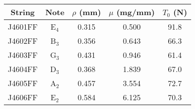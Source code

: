 \begin{tabular}{ccccc}
\toprule
String & Note & $\rho$ (mm) & $\mu$ (mg/mm) & $T_0$ (N) \\
\midrule
J4601FF & E$_{4}$ & 0.315 & 0.500 & 91.8 \\
J4602FF & B$_{3}$ & 0.356 & 0.643 & 66.3 \\
J4603FF & G$_{3}$ & 0.431 & 0.946 & 61.4 \\
J4604FF & D$_{3}$ & 0.368 & 1.839 & 67.0 \\
J4605FF & A$_{2}$ & 0.457 & 3.554 & 72.7 \\
J4606FF & E$_{2}$ & 0.584 & 6.125 & 70.3 \\
\bottomrule
\end{tabular}

